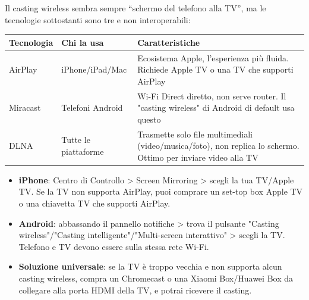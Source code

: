 


Il casting wireless sembra sempre “schermo del telefono alla TV”, ma le tecnologie sottostanti sono tre e non interoperabili:

\begin{center}
\begin{tabularx}{\linewidth}{|X|X|X|}
\hline
\textbf{Tecnologia} & \textbf{Chi la usa} & \textbf{Caratteristiche} \tabularnewline
\hline
AirPlay & iPhone/iPad/Mac & Ecosistema Apple, l'esperienza più fluida. Richiede Apple TV o una TV che supporti AirPlay \tabularnewline
Miracast & Telefoni Android & Wi-Fi Direct diretto, non serve router. Il "casting wireless" di Android di default usa questo \tabularnewline
DLNA & Tutte le piattaforme & Trasmette solo file multimediali (video/musica/foto), non replica lo schermo. Ottimo per inviare video alla TV \tabularnewline
\hline
\end{tabularx}
\end{center}


\begin{itemize}
  \item \textbf{iPhone}: Centro di Controllo > Screen Mirroring > scegli la tua TV/Apple TV. Se la TV non supporta AirPlay, puoi comprare un set-top box Apple TV o una chiavetta TV che supporti AirPlay.
  \item \textbf{Android}: abbassando il pannello notifiche > trova il pulsante "Casting wireless"/"Casting intelligente"/"Multi-screen interattivo" > scegli la TV. Telefono e TV devono essere sulla stessa rete Wi-Fi.
  \item \textbf{Soluzione universale}: se la TV è troppo vecchia e non supporta alcun casting wireless, compra un Chromecast o una Xiaomi Box/Huawei Box da collegare alla porta HDMI della TV, e potrai ricevere il casting.
\end{itemize}

